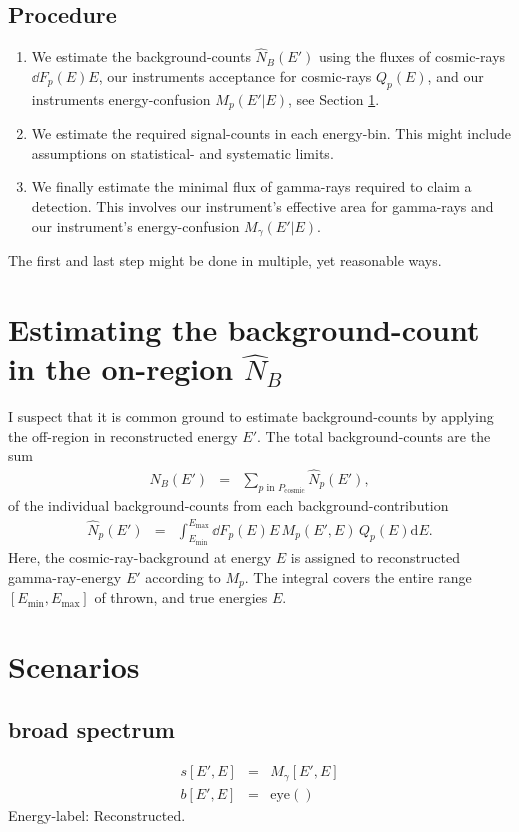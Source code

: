 \documentclass{article}%
\begin{document}
\subsection{Procedure}
%
\begin{enumerate}
\item We estimate the background-counts $\hat{N}_B(E')$ using the fluxes of cosmic-rays $\dd{F_p(E)}{E}$, our instruments acceptance for cosmic-rays $Q_p(E)$, and our instruments energy-confusion $M_p(E'\vert E)$, see Section \ref{SecEstimatingTheBackgroundCount}.
%
\item We estimate the required signal-counts in each energy-bin. This might include assumptions on statistical- and systematic limits.
%
\item We finally estimate the minimal flux of gamma-rays required to claim a detection. This involves our instrument's effective area for gamma-rays and our instrument's energy-confusion $M_{\gamma}(E'\vert E)$. 
%
\end{enumerate}
%
The first and last step might be done in multiple, yet reasonable ways.
%
\section{Estimating the background-count in the on-region $\hat{N}_B$}
\label{SecEstimatingTheBackgroundCount}
%
I suspect that it is common ground to estimate background-counts by applying the off-region in reconstructed energy $E'$.
%
The total background-counts are the sum
%
\begin{eqnarray}
\hat{N}_B(E')
&=&
\sum_{
    p\,\,\text{in}\,\,P_\text{cosmic}
}{
    \hat{N}_p(E')
}
,
\label{EqHatNb}
\end{eqnarray}
%
of the individual background-counts from each background-contribution
%
\begin{eqnarray}
\hat{N}_p(E')
    &=&
\int_{E_\mathrm{min}}^{E_\mathrm{max}}
{
    \dd{F_p(E)}{E}\,M_p(E', E)\,Q_p(E) \mathrm{d}E
}.
\label{EqHatNp}
\end{eqnarray}
%
Here, the cosmic-ray-background at energy $E$ is assigned to reconstructed gamma-ray-energy $E'$ according to $M_p$.
%
The integral covers the entire range $[E_\text{min}, E_\text{max}]$ of thrown, and true energies $E$.
%
\section{Scenarios}
%
\subsection{broad spectrum}
\begin{eqnarray}
s[E', E] &=& M_{\gamma}[E',E]
\\
b[E', E] &=& \mathrm{eye}()
\end{eqnarray}
%
Energy-label: Reconstructed.
%
\end{document}
